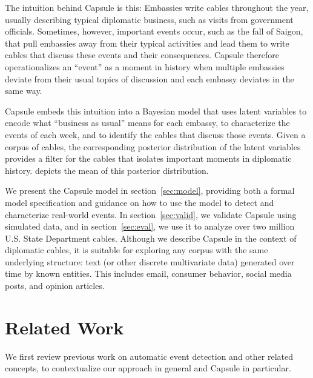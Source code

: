 The intuition behind Capsule is this: Embassies write cables
throughout the year, usually describing typical diplomatic business,
such as visits from government officials. Sometimes, however,
important events occur, such as the fall of Saigon, that pull
embassies away from their typical activities and lead them to write
cables that discuss these events and their consequences. Capsule
therefore operationalizes an ``event'' as a moment in history when
multiple embassies deviate from their usual topics of discussion and
each embassy deviates in the same way.

Capsule embeds this intuition into a Bayesian model that uses latent
variables to encode what ``business as usual'' means for each embassy,
to characterize the events of each week, and to identify the cables
that discuss those events. Given a corpus of cables, the corresponding
posterior distribution of the latent variables provides a filter for
the cables that isolates important moments in diplomatic
history.  depicts the mean of this posterior
distribution.

We present the Capsule model in section~\ref{sec:model}, providing
both a formal model specification and guidance on how to use the model
to detect and characterize real-world events. In
section~\ref{sec:valid}, we validate Capsule using simulated data, and
in section~\ref{sec:eval}, we use it to analyze over two million
U.S. State Department cables. Although we describe Capsule in the
context of diplomatic cables, it is suitable for exploring any corpus
with the same underlying structure: text (or other discrete
multivariate data) generated over time by known entities. This
includes email, consumer behavior, social media posts, and opinion
articles.

\section{Related Work}



We first review previous work on automatic event detection and other
related concepts, to contextualize our approach in general and Capsule
in particular.


